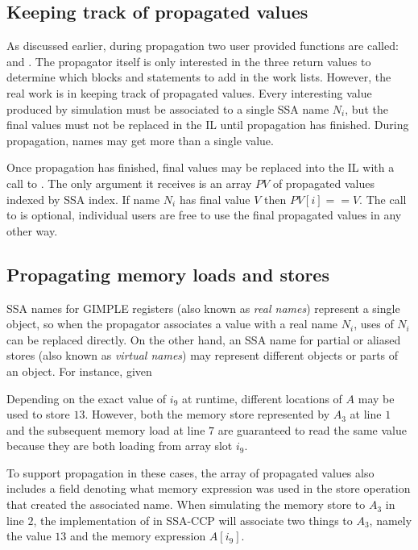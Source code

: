 \subsection{Keeping track of propagated values}

As discussed earlier, during propagation two user provided
functions are called:  and
.  The propagator itself is only
interested in the three return values to determine which blocks
and statements to add in the work lists.  However, the real work
is in keeping track of propagated values.  Every interesting
value produced by simulation must be associated to a single SSA
name $N_i$, but the final values must not be replaced in the IL
until propagation has finished.  During propagation, names may
get more than a single value.

Once propagation has finished, final values may be replaced into
the IL with a call to .  The only
argument it receives is an array $PV$ of propagated values indexed by
SSA index.  If name $N_i$ has final value $V$ then $PV[i] == V$.
The call to  is optional,
individual users are free to use the final propagated values in
any other way.


\subsection{Propagating memory loads and stores}

SSA names for GIMPLE registers (also known as \textit{real
names}) represent a single object, so when the propagator
associates a value with a real name $N_i$, uses of $N_i$ can be
replaced directly.  On the other hand, an SSA name for partial
or aliased stores (also known as \textit{virtual names})
may represent different objects or parts of an object.  For
instance, given

\begin{center}
\parbox{2in}{}
\end{center}

Depending on the exact value of $i_9$ at runtime, different
locations of $A$ may be used to store $13$.  However, both the
memory store represented by $A_3$ at line $1$ and the subsequent
memory load at line $7$ are guaranteed to read the same value
because they are both loading from array slot $i_9$.

To support propagation in these cases, the array of propagated
values also includes a field denoting what memory expression was
used in the store operation that created the associated name.
When simulating the memory store to $A_3$ in line $2$, the
implementation of  in SSA-CCP will
associate two things to $A_3$, namely the value $13$ and the
memory expression $A[i_9]$.

